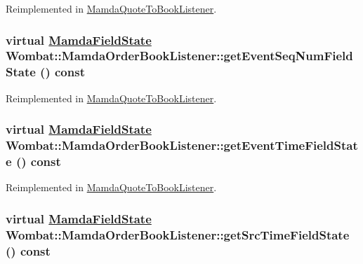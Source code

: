 Reimplemented in \hyperlink{classMamdaQuoteToBookListener_7c760a83b876e17c52537cbd885697d5}{Mamda\-Quote\-To\-Book\-Listener}.\hypertarget{classWombat_1_1MamdaOrderBookListener_f48b72f5bed1a318a9487cffaf965d79}{
\subsubsection[getEventSeqNumFieldState]{\setlength{\rightskip}{0pt plus 5cm}virtual \hyperlink{namespaceWombat_93aac974f2ab713554fd12a1fa3b7d2a}{Mamda\-Field\-State} Wombat::Mamda\-Order\-Book\-Listener::get\-Event\-Seq\-Num\-Field\-State () const}}
\label{classWombat_1_1MamdaOrderBookListener_f48b72f5bed1a318a9487cffaf965d79}




Reimplemented in \hyperlink{classMamdaQuoteToBookListener_fea891c59bf8468fd07df1730f95399b}{Mamda\-Quote\-To\-Book\-Listener}.\hypertarget{classWombat_1_1MamdaOrderBookListener_ff57a8efade5c642a3d871debb2cd056}{
\subsubsection[getEventTimeFieldState]{\setlength{\rightskip}{0pt plus 5cm}virtual \hyperlink{namespaceWombat_93aac974f2ab713554fd12a1fa3b7d2a}{Mamda\-Field\-State} Wombat::Mamda\-Order\-Book\-Listener::get\-Event\-Time\-Field\-State () const}}
\label{classWombat_1_1MamdaOrderBookListener_ff57a8efade5c642a3d871debb2cd056}




Reimplemented in \hyperlink{classMamdaQuoteToBookListener_25e9bef42468b7b169032cb6e2c330c8}{Mamda\-Quote\-To\-Book\-Listener}.\hypertarget{classWombat_1_1MamdaOrderBookListener_cd480d3e1ecf4c3f2d726b907f4b34c3}{
\subsubsection[getSrcTimeFieldState]{\setlength{\rightskip}{0pt plus 5cm}virtual \hyperlink{namespaceWombat_93aac974f2ab713554fd12a1fa3b7d2a}{Mamda\-Field\-State} Wombat::Mamda\-Order\-Book\-Listener::get\-Src\-Time\-Field\-State () const}}
\label{classWombat_1_1MamdaOrderBookListener_cd480d3e1ecf4c3f2d726b907f4b34c3}




